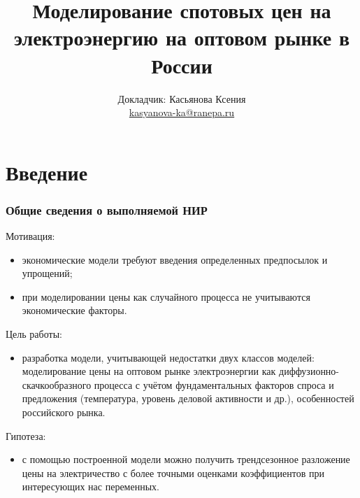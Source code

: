 \documentclass[c, dvipsnames]{beamer}  %
\title[   Моделирование цен на электричество ]{Моделирование спотовых цен на электроэнергию    на оптовом рынке  в России }
\author[Касьянова Ксения]{Докладчик: Касьянова Ксения \\ \smallskip  \href{mailto:kasyanova-ka@ranepa.ru}{kasyanova-ka@ranepa.ru}   \bigskip \scriptsize }
\institute[ИОРИ РАНХиГС]{ \uppercase{
  Институт отраслевых рынков и инфраструктуры} \\ \smallskip   Лаборатория системного анализа
отраслевых рынков }
\date{}
\begin{document}
\frame[plain]{\titlepage}	%


\section{Введение}

\begin{frame}[shrink=3]

\frametitle{Общие сведения о выполняемой НИР} 

\footnotesize

\begin{block}{Мотивация:}
	\begin{itemize}		
		\item экономические модели требуют введения определенных предпосылок и упрощений;
		\item при моделировании цены как случайного процесса не учитываются экономические факторы.
	\end{itemize}
\end{block}

\begin{block}{Цель работы:}
\begin{itemize}
	\item разработка модели, учитывающей недостатки двух классов моделей:    моделирование цены на оптовом рынке электроэнергии как диффузионно-скачкообразного процесса  с учётом фундаментальных факторов спроса и предложения (температура, уровень деловой активности и др.),  особенностей российского рынка. 		
\end{itemize}
\end{block}



\begin{block}{Гипотеза:}
	\begin{itemize}
		\item с помощью построенной модели можно получить трендсезонное разложение цены на электричество с более точными оценками коэффициентов при интересующих нас переменных. 
	\end{itemize}
\end{block}

\end{frame}
\end{document}
